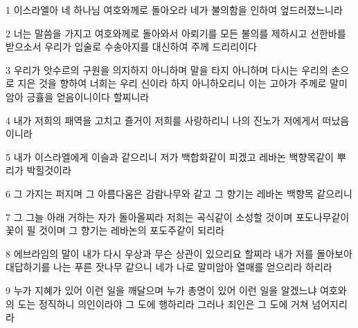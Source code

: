 \par 1 이스라엘아 네 하나님 여호와께로 돌아오라 네가 불의함을 인하여 엎드러졌느니라
\par 2 너는 말씀을 가지고 여호와께로 돌아와서 아뢰기를 모든 불의를 제하시고 선한바를 받으소서 우리가 입술로 수송아지를 대신하여 주께 드리리이다
\par 3 우리가 앗수르의 구원을 의지하지 아니하며 말을 타지 아니하며 다시는 우리의 손으로 지은 것을 향하여 너희는 우리 신이라 하지 아니하오리니 이는 고아가 주께로 말미암아 긍휼을 얻음이니이다 할찌니라
\par 4 내가 저희의 패역을 고치고 즐거이 저희를 사랑하리니 나의 진노가 저에게서 떠났음이니라
\par 5 내가 이스라엘에게 이슬과 같으리니 저가 백합화같이 피겠고 레바논 백향목같이 뿌리가 박힐것이라
\par 6 그 가지는 퍼지며 그 아름다움은 감람나무와 같고 그 향기는 레바논 백향목 같으리니
\par 7 그 그늘 아래 거하는 자가 돌아올찌라 저희는 곡식같이 소성할 것이며 포도나무같이 꽃이 필 것이며 그 향기는 레바논의 포도주같이 되리라
\par 8 에브라임의 말이 내가 다시 우상과 무슨 상관이 있으리요 할찌라 내가 저를 돌아보아 대답하기를 나는 푸른 잣나무 같으니 네가 나로 말미암아 열매를 얻으리라 하리라
\par 9 누가 지혜가 있어 이런 일을 깨달으며 누가 총명이 있어 이런 일을 알겠느냐 여호와의 도는 정직하니 의인이라야 그 도에 행하리라 그러나 죄인은 그 도에 거쳐 넘어지리라


